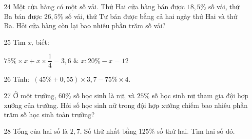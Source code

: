 \gap
\begin{probbox}{24}{\relax}
Một cửa hàng có một số vải. Thứ Hai cửa hàng bán được $18{,}5\%$ số vải, thứ Ba bán được $26{,}5\%$ số vải, thứ Tư bán được bằng cả hai ngày thứ Hai và thứ Ba. Hỏi cửa hàng còn lại bao nhiêu phần trăm số vải?
\end{probbox}
\gap
\begin{probbox}{25}{\relax}
Tìm $x$, biết:
\begin{cols2}
 $75\%\times x+x\times\dfrac14=3{,}6$ &  $x:20\%-x=12$
\end{cols2}
\end{probbox}
\gap
\begin{probbox}{26}{\relax}
Tính: $\ (45\%+0{,}55)\times3{,}7-75\%\times4$.
\end{probbox}
\gap
\begin{probbox}{27}{\relax}
Ở một trường, $60\%$ số học sinh là nữ, và $25\%$ số học sinh nữ tham gia đội hợp xướng của trường. Hỏi số học sinh nữ trong đội hợp xướng chiếm bao nhiêu phần trăm số học sinh toàn trường?
\end{probbox}
\gap
\begin{probbox}{28}{\relax}
Tổng của hai số là $2{,}7$. Số thứ nhất bằng $125\%$ số thứ hai. Tìm hai số đó.
\end{probbox}
